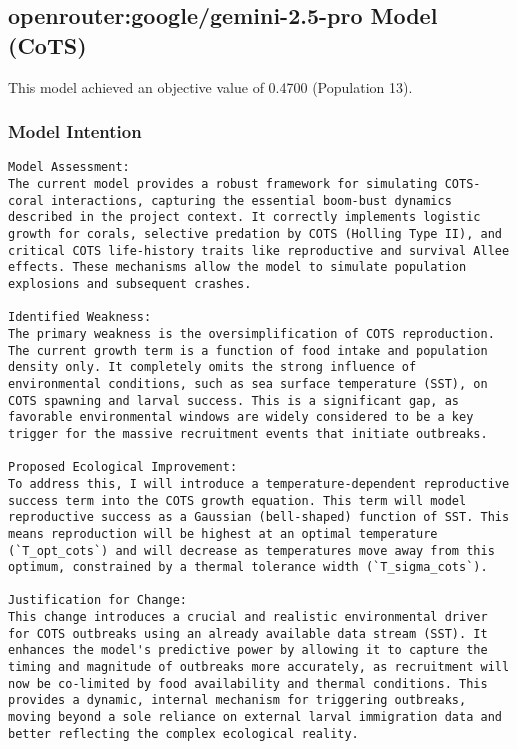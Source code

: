 \subsection{openrouter:google/gemini-2.5-pro Model (CoTS)}
This model achieved an objective value of 0.4700 (Population 13).

\subsubsection{Model Intention}
\begin{lstlisting}
Model Assessment:
The current model provides a robust framework for simulating COTS-coral interactions, capturing the essential boom-bust dynamics described in the project context. It correctly implements logistic growth for corals, selective predation by COTS (Holling Type II), and critical COTS life-history traits like reproductive and survival Allee effects. These mechanisms allow the model to simulate population explosions and subsequent crashes.

Identified Weakness:
The primary weakness is the oversimplification of COTS reproduction. The current growth term is a function of food intake and population density only. It completely omits the strong influence of environmental conditions, such as sea surface temperature (SST), on COTS spawning and larval success. This is a significant gap, as favorable environmental windows are widely considered to be a key trigger for the massive recruitment events that initiate outbreaks.

Proposed Ecological Improvement:
To address this, I will introduce a temperature-dependent reproductive success term into the COTS growth equation. This term will model reproductive success as a Gaussian (bell-shaped) function of SST. This means reproduction will be highest at an optimal temperature (`T_opt_cots`) and will decrease as temperatures move away from this optimum, constrained by a thermal tolerance width (`T_sigma_cots`).

Justification for Change:
This change introduces a crucial and realistic environmental driver for COTS outbreaks using an already available data stream (SST). It enhances the model's predictive power by allowing it to capture the timing and magnitude of outbreaks more accurately, as recruitment will now be co-limited by food availability and thermal conditions. This provides a dynamic, internal mechanism for triggering outbreaks, moving beyond a sole reliance on external larval immigration data and better reflecting the complex ecological reality.
\end{lstlisting}

